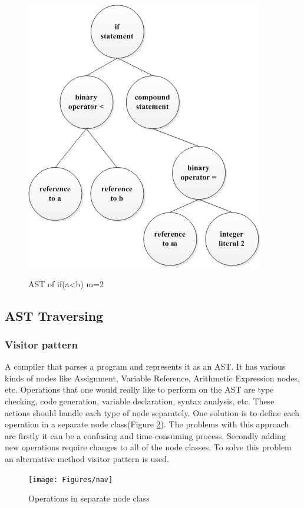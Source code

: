  

 
 \begin{figure}[H]
 	
 	
 	\centering
 	\includegraphics[width=.6\linewidth]{Figures/image1}
 	\caption{AST of  if(a\textless b) m=2}
 	\label{Fig:1}\cite{}
 	
 \end{figure}

 \subsection{AST Traversing}
 
\subsubsection{Visitor pattern} 
 A compiler that parses a program and represents it as an AST. It has various
 kinds of nodes like Assignment, Variable Reference, Arithmetic
 Expression nodes, etc. Operations that one would really like to perform on the AST are type checking, code generation, variable declaration, syntax analysis, etc. These actions  should handle each type of node separately. One solution  is to define each operation in a separate node class(Figure \ref{Fig:2}). The problems with this approach are firstly it can be a confusing and time-consuming process. Secondly adding new operations require changes to all of the node classes. To solve this problem an alternative method visitor pattern is used\cite{ood}.  
 
  \begin{figure}[H]
  	
  	
  	\centering
  	\texttt{[image: Figures/nav]}
  	\caption{Operations in separate node class}
  	\label{Fig:2} 
  	
  \end{figure}
 
